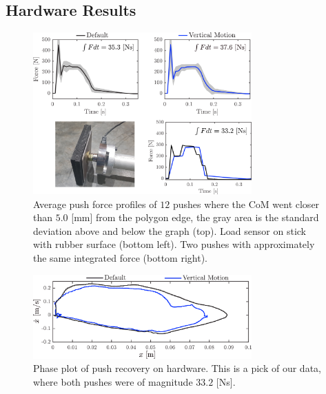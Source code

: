 \documentclass[letterpaper, 10 pt, conference]{ieeeconf}  %
\begin{document}
\subsection{Hardware Results}\label{subsec:hardware}
\begin{figure}
      \centering
      \includegraphics[width=3.3in]{impulsecompare2.png}
      \caption{Average push force profiles of $12$ pushes where the CoM went closer than $5.0$ [mm] from the polygon edge, the gray area is the standard deviation above and below the graph (top). Load sensor on stick with rubber surface (bottom left). Two pushes with approximately the same integrated force (bottom right).}
      \label{fig:impulsecompare}
\end{figure}
\begin{figure}
      \centering
      \includegraphics[width=3.3in]{valcomparephaseHW.png}
      \caption{Phase plot of push recovery on hardware. This is a pick of our data, where both pushes were of magnitude $33.2$ [Ns]. }
      \label{fig:valcomparephaseHW}
\end{figure}
\end{document}
